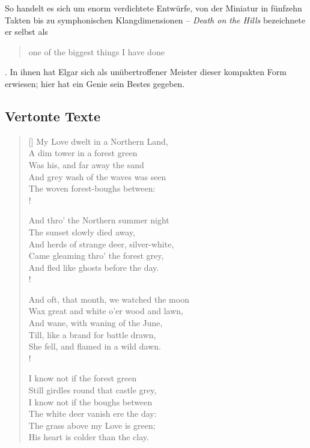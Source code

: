 \documentclass[a4paper,11pt,open=any]{scrbook}
\newcommand{\attrib}[1]{%
\nopagebreak{\raggedleft\footnotesize #1\par}}
\newcommand{\engquote}[1]{\foreignblockquote{english}{#1}}
\begin{document}
So handelt es sich um enorm verdichtete Entwürfe, von der Miniatur in
fünfzehn Takten bis zu symphonischen Klangdimensionen – \textit{Death on
the Hills} bezeichnete er selbst als \engquote{one of the biggest things
I have done}\cite[In einem Brief an Alice Stuart-Wortley, zitiert nach]
[S.~660]{moore}.  In ihnen hat Elgar sich als unübertroffener Meister
dieser kompakten Form erwiesen; hier hat ein Genie sein Bestes gegeben.



\begin{appendices}
 \chapter{Vertonte Texte}
 
 \label{poem:my-love}
 \settowidth{\versewidth}{My Love dwelt in a Northern Land,}
 \begin{verse}[\versewidth]
   My Love dwelt in a {Northern Land,} \\
   A dim tower in a forest green \\
   Was his, and far away the sand \\
   And grey wash of the waves was seen \\
   The woven forest-boughs between: \\!
   
   And thro’ the Northern summer night \\
   The sunset slowly died away, \\
   And herds of strange deer, silver-white, \\
   Came gleaming thro’ the forest grey, \\
   And fled like ghosts before the day. \\!
   
   And oft, that month, we watched the moon \\
   Wax great and white o’er wood and lawn, \\
   And wane, with waning of the June, \\
   Till, like a brand for battle drawn, \\
   She fell, and flamed in a wild dawn. \\!
   
   I know not if the forest green \\
   Still girdles round that castle grey, \\
   I know not if the boughs between \\
   The white deer vanish ere the day: \\
   The grass above my Love is green; \\
   His heart is colder than the clay. \\
   \attrib{Andrew Lang (1844–1912)}
 \end{verse}


\end{appendices}
\end{document}
